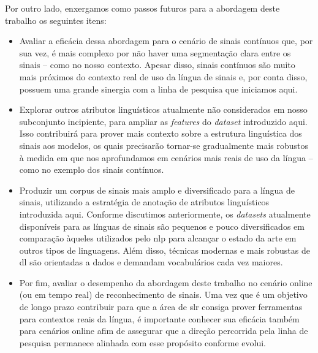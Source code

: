 Por outro lado, enxergamos como passos futuros para a abordagem deste trabalho os seguintes itens:


\begin{itemize}
    \item Avaliar a eficácia dessa abordagem para o cenário de sinais contínuos que, por sua vez, é mais complexo por não haver uma segmentação clara entre os sinais -- como no nosso contexto.
          Apesar disso, sinais contínuos são muito mais próximos do contexto real de uso da língua de sinais e, por conta disso, possuem uma grande sinergia com a linha de pesquisa que iniciamos aqui.

    \item Explorar outros atributos linguísticos atualmente não considerados em nosso subconjunto incipiente, para ampliar as \textit{features} do \textit{dataset} introduzido aqui.
          Isso contribuirá para prover mais contexto sobre a estrutura linguística dos sinais aos modelos, os quais precisarão tornar-se gradualmente mais robustos à medida em que nos aprofundamos em cenários mais reais de uso da língua -- como no exemplo dos sinais contínuos.

    \item Produzir um corpus de sinais mais amplo e diversificado para a língua de sinais, utilizando a estratégia de anotação de atributos linguísticos introduzida aqui.
          Conforme discutimos anteriormente, os \textit{datasets} atualmente disponíveis para as línguas de sinais são pequenos e pouco diversificados em comparação àqueles utilizados pelo \acrfull{nlp} para alcançar o estado da arte em outros tipos de linguagens.
          Além disso, técnicas modernas e mais robustas de \acrlong{dl} são orientadas a dados e demandam vocabulários cada vez maiores.

    \item Por fim, avaliar o desempenho da abordagem deste trabalho no cenário online (ou em tempo real) de reconhecimento de sinais.
          Uma vez que é um objetivo de longo prazo contribuir para que a área de \acrshort{slr} consiga prover ferramentas para contextos reais da língua, é importante conhecer sua eficácia também para cenários online afim de assegurar que a direção percorrida pela linha de pesquisa permanece alinhada com esse propósito conforme evolui.
\end{itemize}



